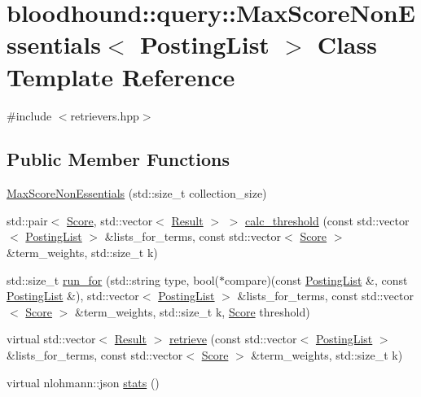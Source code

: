 \hypertarget{classbloodhound_1_1query_1_1MaxScoreNonEssentials}{}\section{bloodhound\+:\+:query\+:\+:Max\+Score\+Non\+Essentials$<$ Posting\+List $>$ Class Template Reference}
\label{classbloodhound_1_1query_1_1MaxScoreNonEssentials}


{\ttfamily \#include $<$retrievers.\+hpp$>$}

\subsection*{Public Member Functions}
\begin{DoxyCompactItemize}
\item 
\mbox{\hyperlink{classbloodhound_1_1query_1_1MaxScoreNonEssentials_a4ca74b906a87120ffcad3bc6edcc148c}{Max\+Score\+Non\+Essentials}} (std\+::size\+\_\+t collection\+\_\+size)
\item 
std\+::pair$<$ \mbox{\hyperlink{structbloodhound_1_1Score}{Score}}, std\+::vector$<$ \mbox{\hyperlink{structbloodhound_1_1query_1_1Result}{Result}} $>$ $>$ \mbox{\hyperlink{classbloodhound_1_1query_1_1MaxScoreNonEssentials_a99253d51fb9d66cb6c4fd97e499ab1b0}{calc\+\_\+threshold}} (const std\+::vector$<$ \mbox{\hyperlink{classbloodhound_1_1PostingList}{Posting\+List}} $>$ \&lists\+\_\+for\+\_\+terms, const std\+::vector$<$ \mbox{\hyperlink{structbloodhound_1_1Score}{Score}} $>$ \&term\+\_\+weights, std\+::size\+\_\+t k)
\item 
std\+::size\+\_\+t \mbox{\hyperlink{classbloodhound_1_1query_1_1MaxScoreNonEssentials_a8ae12fdfe4bedefa5811bd89ffcf5597}{run\+\_\+for}} (std\+::string type, bool($\ast$compare)(const \mbox{\hyperlink{classbloodhound_1_1PostingList}{Posting\+List}} \&, const \mbox{\hyperlink{classbloodhound_1_1PostingList}{Posting\+List}} \&), std\+::vector$<$ \mbox{\hyperlink{classbloodhound_1_1PostingList}{Posting\+List}} $>$ \&lists\+\_\+for\+\_\+terms, const std\+::vector$<$ \mbox{\hyperlink{structbloodhound_1_1Score}{Score}} $>$ \&term\+\_\+weights, std\+::size\+\_\+t k, \mbox{\hyperlink{structbloodhound_1_1Score}{Score}} threshold)
\item 
virtual std\+::vector$<$ \mbox{\hyperlink{structbloodhound_1_1query_1_1Result}{Result}} $>$ \mbox{\hyperlink{classbloodhound_1_1query_1_1MaxScoreNonEssentials_a71c9050ca5961f061a659250932b42c2}{retrieve}} (const std\+::vector$<$ \mbox{\hyperlink{classbloodhound_1_1PostingList}{Posting\+List}} $>$ \&lists\+\_\+for\+\_\+terms, const std\+::vector$<$ \mbox{\hyperlink{structbloodhound_1_1Score}{Score}} $>$ \&term\+\_\+weights, std\+::size\+\_\+t k)
\item 
virtual nlohmann\+::json \mbox{\hyperlink{classbloodhound_1_1query_1_1MaxScoreNonEssentials_afb9b4ca76cca49d32ba584555d0b91fe}{stats}} ()
\end{DoxyCompactItemize}
